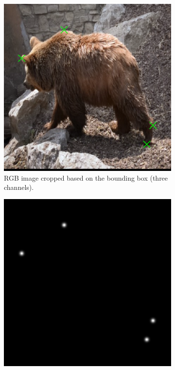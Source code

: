 \begin{figure}
	\centering
	\begin{subfigure}[b]{0.3\textwidth}
		\centering
		\includegraphics[width=\textwidth]{figures/chap33_channel_rgb.png}
		\caption{RGB image cropped based on the bounding box (three channels).}
		\label{fig:ch3:sec3:rgb_channel}
	\end{subfigure}
	\hfill
	\begin{subfigure}[b]{0.3\textwidth}
		\centering
		\includegraphics[width=\textwidth]{figures/chap33_channel_fg.png}

\end{subfigure}
\end{figure}
